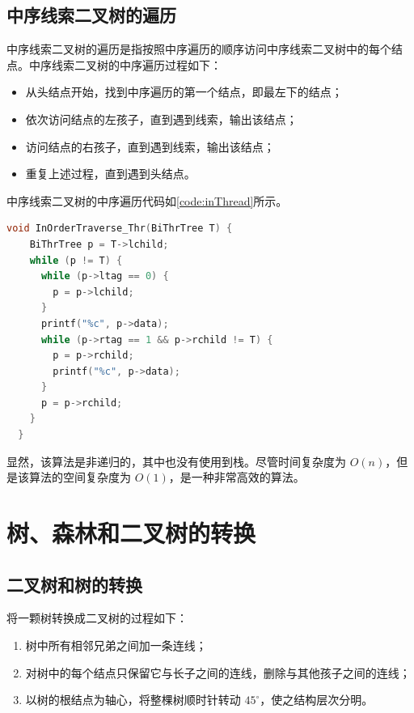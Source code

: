 \documentclass[lang=cn,newtx,10pt,scheme=chinese]{elegantbook}
\begin{document}
\subsection{中序线索二叉树的遍历}

中序线索二叉树的遍历是指按照中序遍历的顺序访问中序线索二叉树中的每个结点。中序线索二叉树的中序遍历过程如下：

\begin{itemize}
  \item 从头结点开始，找到中序遍历的第一个结点，即最左下的结点；
  \item 依次访问结点的左孩子，直到遇到线索，输出该结点；
  \item 访问结点的右孩子，直到遇到线索，输出该结点；
  \item 重复上述过程，直到遇到头结点。
  \end{itemize}

中序线索二叉树的中序遍历代码如\ref{code:inThread}所示。

\begin{lstlisting}[language=C++, caption={中序线索二叉树的中序遍历}, label={code:inThread}]
  void InOrderTraverse_Thr(BiThrTree T) {
    BiThrTree p = T->lchild;
    while (p != T) {
      while (p->ltag == 0) {
        p = p->lchild;
      }
      printf("%c", p->data);
      while (p->rtag == 1 && p->rchild != T) {
        p = p->rchild;
        printf("%c", p->data);
      }
      p = p->rchild;
    }
  }

\end{lstlisting}

显然，该算法是非递归的，其中也没有使用到栈。尽管时间复杂度为 $O(n)$，但是该算法的空间复杂度为 $O(1)$，是一种非常高效的算法。
\section{树、森林和二叉树的转换}

\subsection{二叉树和树的转换}

将一颗树转换成二叉树的过程如下：
\begin{enumerate}
  \item 树中所有相邻兄弟之间加一条连线；
  \item 对树中的每个结点只保留它与长子之间的连线，删除与其他孩子之间的连线；
  \item 以树的根结点为轴心，将整棵树顺时针转动 $45^\circ$，使之结构层次分明。
\end{enumerate}
\end{document}
